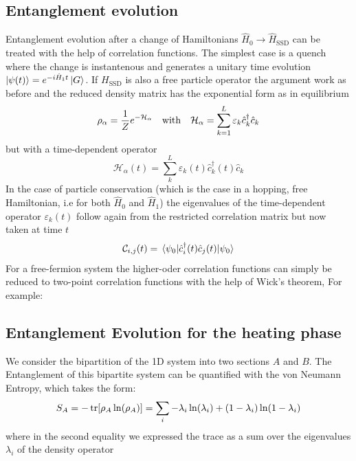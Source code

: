 \documentclass[11pt, a4paper]{article}
\theoremstyle{definition} %
\begin{document}
	\subsection{Entanglement evolution}
	Entanglement evolution after a change of Hamiltonians $\hat{H}_0 \rightarrow \hat{H}_\text{SSD}$ can be treated with the help of correlation functions. The simplest case is a quench where the change is instantenous and generates a unitary time evolution $\ket{\psi(t)} = e^{-i \hat{H}_1t} \ket{G}$. If $H_\text{SSD}$ is also a free particle operator the argument work as before and the reduced density matrix has the exponential form as in equilibrium 
	\begin{equation}
		\rho_\alpha = \frac{1}{Z} e^{-\mathcal{H}_\alpha} \qq{with} \mathcal{H}_\alpha = \sum_{k=1}^L \varepsilon_k \hat{c}_k^\dagger \hat{c}_k
	\end{equation}
	but with a time-dependent operator
	\begin{equation}
		\mathcal{H}_\alpha(t) = \sum_{k}^L \varepsilon_k(t) \hat{c}_k^\dagger(t) \hat{c}_k
	\end{equation}
	In the case of particle conservation (which is the case in a hopping, free Hamiltonian, i.e for both $\hat{H}_0$ and $\hat{H}_1$) the eigenvalues of the time-dependent operator $\varepsilon_k(t)$ follow again from the restricted correlation matrix but now taken at time $t$
	\begin{equation}
		\mathcal{C}_{i,j}(t) = \mel{\psi_0}{\hat{c}_i^\dagger(t) \hat{c}_j(t)}{\psi_0}
	\end{equation}
	For a free-fermion system the higher-oder correlation functions can simply be reduced to two-point correlation functions with the help of Wick's theorem, For example:
	
	
		\subsection{Entanglement Evolution for the heating phase}
	We consider the bipartition of the 1D system into two sections $A$ and $B$. The Entanglement of this bipartite system can be quantified with the von Neumann Entropy, which takes the form:
	\begin{equation}
		S_A = -\trace[\rho_A \ln(\rho_A)] = \sum_i -\lambda_i \ln(\lambda_i) + (1-\lambda_i)\ln(1-\lambda_i)
	\end{equation}
	where in the second equality we expressed the trace as a sum over the eigenvalues $\lambda_i$ of the density operator \\
	
\end{document}

